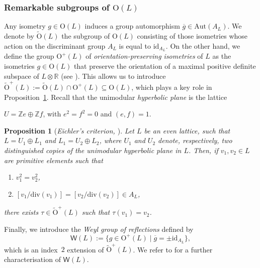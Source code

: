 \documentclass[12pt,a4paper]{amsart}
\theoremstyle{plain}
\newtheorem{prop}[thm]{Proposition}
\theoremstyle{definition}
\theoremstyle{remark}
\def\id{\mathrm{id}}
\def\Z{\mathbb{Z}}
\newcommand{\RR}{\mathbb{R}}
\begin{document}
\subsubsection{Remarkable subgroups of $\mathrm{O}(L)$}
Any isometry $g \in \mathrm{O}(L)$ induces a group automorphism $\overline{g} \in \mathrm{Aut}(A_L)$. We denote by $\widetilde{\mathrm{O}}(L)$ the subgroup of $\mathrm{O}(L)$ consisting of those isometries whose action on the discriminant group $A_L$ is equal to $\id_{A_L}$. On the other hand, we define the group $\mathrm{O}^+(L)$ of \textit{orientation-preserving isometries} of $L$ as the isometries $g \in \mathrm{O}(L)$ that preserve the orientation of a maximal positive definite subspace of $L \otimes \RR$ (see \cite[Section~4]{Mar11}). This allows us to introduce
$\widetilde{\mathrm{O}}^+(L) := \widetilde{\mathrm{O}}(L) \cap \mathrm{O}^+(L) \subseteq \mathrm{O}(L)$, which plays a key role in Proposition~\ref{prop_eichler}. Recall that the unimodular \textit{hyperbolic plane} is the lattice
\begin{center}
    $U = \Z e \oplus \Z f$, with $e^2 = f^2 = 0$ and $(e,f) = 1$.
\end{center}

\begin{prop}[\textit{Eichler's criterion, \cite[Proposition~3.3(i)]{gritsenko-hulek-sankaran-abelianisation}}]\label{prop_eichler}
Let $L$ be an even lattice, such that $L=U_1\oplus L_1$ and $L_1=U_2\oplus L_2$, where $U_1$ and $U_2$ denote, respectively, two distinguished copies of the unimodular hyperbolic plane in $L$. Then, if $v_1,v_2\in L$ are primitive elements such that
\begin{enumerate}
    \item [{\normalfont{(1)}}] $v_1^2=v_2^2$,
    \item [{\normalfont{(2)}}] $[v_1/\mathrm{div}(v_1)]=[v_2/\mathrm{div}(v_2)]\in A_L$,
\end{enumerate}
there exists $\tau\in \widetilde{\mathrm{O}}^{+}(L)$ such that $\tau(v_1)=v_2$.
\end{prop}

Finally, we introduce the \textit{Weyl group of reflections} defined by
\begin{equation}
    \label{weylgrp}
    \mathsf{W}(L) := \{ g \in \mathrm{O}^+(L) \mid \overline{g} = \pm \id_{A_L} \},
\end{equation} which is an index~$2$ extension of $\widetilde{\mathrm{O}}^+(L)$. We refer to \cite[Lemma~4.10]{Mar08} for a further characterisation of $\mathsf{W}(L)$.
\end{document}
